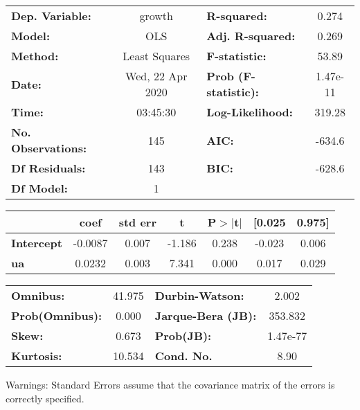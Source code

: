 \begin{center}
\begin{tabular}{lclc}
\toprule
\textbf{Dep. Variable:}    &      growth      & \textbf{  R-squared:         } &     0.274   \\
\textbf{Model:}            &       OLS        & \textbf{  Adj. R-squared:    } &     0.269   \\
\textbf{Method:}           &  Least Squares   & \textbf{  F-statistic:       } &     53.89   \\
\textbf{Date:}             & Wed, 22 Apr 2020 & \textbf{  Prob (F-statistic):} &  1.47e-11   \\
\textbf{Time:}             &     03:45:30     & \textbf{  Log-Likelihood:    } &    319.28   \\
\textbf{No. Observations:} &         145      & \textbf{  AIC:               } &    -634.6   \\
\textbf{Df Residuals:}     &         143      & \textbf{  BIC:               } &    -628.6   \\
\textbf{Df Model:}         &           1      & \textbf{                     } &             \\
\bottomrule
\end{tabular}
\begin{tabular}{lcccccc}
                   & \textbf{coef} & \textbf{std err} & \textbf{t} & \textbf{P$> |$t$|$} & \textbf{[0.025} & \textbf{0.975]}  \\
\midrule
\textbf{Intercept} &      -0.0087  &        0.007     &    -1.186  &         0.238        &       -0.023    &        0.006     \\
\textbf{ua}        &       0.0232  &        0.003     &     7.341  &         0.000        &        0.017    &        0.029     \\
\bottomrule
\end{tabular}
\begin{tabular}{lclc}
\textbf{Omnibus:}       & 41.975 & \textbf{  Durbin-Watson:     } &    2.002  \\
\textbf{Prob(Omnibus):} &  0.000 & \textbf{  Jarque-Bera (JB):  } &  353.832  \\
\textbf{Skew:}          &  0.673 & \textbf{  Prob(JB):          } & 1.47e-77  \\
\textbf{Kurtosis:}      & 10.534 & \textbf{  Cond. No.          } &     8.90  \\
\bottomrule
\end{tabular}
\end{center}

Warnings: \newline
 [1] Standard Errors assume that the covariance matrix of the errors is correctly specified.